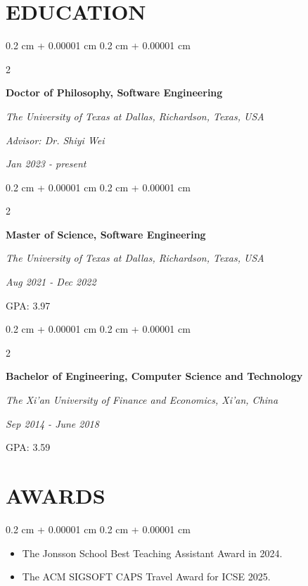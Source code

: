 \documentclass[10pt, letterpaper]{article}
\newenvironment{highlights}{
    \begin{itemize}[
        topsep=0.10 cm,
        parsep=0.10 cm,
        partopsep=0pt,
        itemsep=0pt,
        leftmargin=0.4 cm + 10pt
    ]
}{
    \end{itemize}
} %
\newenvironment{onecolentry}{
    \begin{adjustwidth}{
        0.2 cm + 0.00001 cm
    }{
        0.2 cm + 0.00001 cm
    }
}{
    \end{adjustwidth}
} %
\newenvironment{twocolentry}[2][]{
    \onecolentry
    \def\secondColumn{#2}
    \setcolumnwidth{\fill, 4.5 cm}
    \begin{paracol}{2}
}{
    \switchcolumn \raggedleft \secondColumn
    \end{paracol}
    \endonecolentry
} %
\begin{document}
    \section{EDUCATION}
        
        \begin{twocolentry}{
            
            
        \textit{Jan 2023 - present}}
            \textbf{Doctor of Philosophy, Software Engineering }

            \textit{The University of Texas at Dallas, Richardson, Texas, USA}
            
            \textit{Advisor: Dr. Shiyi Wei}
        \end{twocolentry}

        \vspace{0.20 cm}
        
        \begin{twocolentry}{
            
            
        \textit{Aug 2021 - Dec 2022}
        
        GPA: 3.97
        
        }
        
            \textbf{Master of Science, Software Engineering }

            \textit{The University of Texas at Dallas, Richardson, Texas, USA}
        \end{twocolentry}

        \vspace{0.20 cm}
        
        \begin{twocolentry}{
            
            
        \textit{Sep 2014 - June 2018}
        
        GPA: 3.59 
        
        }
            \textbf{Bachelor of Engineering, Computer Science and Technology}

            \textit{The Xi’an University of Finance and Economics, Xi’an, China}
        \end{twocolentry}


        \section{AWARDS}
    
        \begin{onecolentry}
            \begin{highlights}
                \item The Jonsson School Best Teaching Assistant Award in 2024.
                \item The ACM SIGSOFT CAPS Travel Award for ICSE 2025.
            \end{highlights}
        \end{onecolentry}
\end{document}
